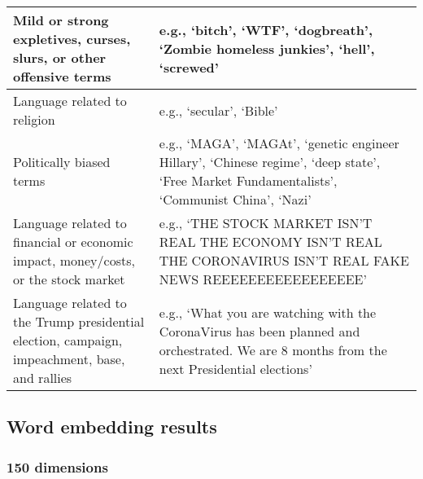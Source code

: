 \documentclass{article}
\begin{document}
\begin{table}[htp]
\begin{tabular}{p{6cm}|p{9cm}}
    \hline
    Mild or strong expletives, curses, slurs, or other offensive terms & e.g., ‘bitch’, ‘WTF’, ‘dogbreath’, ‘Zombie homeless junkies’, ‘hell’, ‘screwed’ \\
    \hline
    Language related to religion & e.g., ‘secular’, ‘Bible’ \\
     \hline
    Politically biased terms & e.g., ‘MAGA’, ‘MAGAt’, ‘genetic engineer Hillary’, ‘Chinese regime’, ‘deep state’, ‘Free Market Fundamentalists’, ‘Communist China’, ‘Nazi’ \\
    \hline
    Language related to financial or economic impact, money/costs, or the stock market & e.g., ‘THE STOCK MARKET ISN’T REAL THE ECONOMY ISN’T REAL THE CORONAVIRUS ISN’T REAL FAKE NEWS REEEEEEEEEEEEEEEEE’ \\
    \hline
    Language related to the Trump presidential election, campaign, impeachment, base, and rallies & e.g., ‘What you are watching with the CoronaVirus has been planned and orchestrated. We are 8 months from the next Presidential elections’ \\
    \hline
  \end{tabular}
  \label{tab:table1words}
\end{table}

\hypertarget{word-embedding-results}{%
\subsection{Word embedding results}\label{word-embedding-results}}

\hypertarget{dimensions}{%
\subsubsection{150 dimensions}\label{dimensions}}
\end{document}
